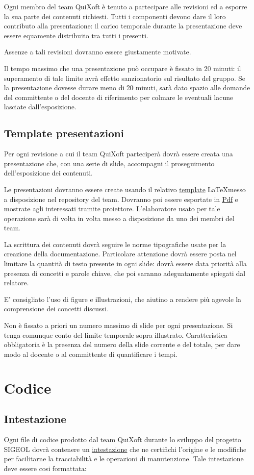 \documentclass[11pt,a4paper]{article}
\begin{document}
Ogni membro del team QuiXoft è tenuto a partecipare alle revisioni ed a esporre la sua parte dei contenuti richiesti.
Tutti i componenti devono dare il loro contributo alla presentazione: il carico temporale durante la presentazione deve essere equamente distribuito tra tutti i presenti.

Assenze a tali revisioni dovranno essere giustamente motivate.

Il tempo massimo che una presentazione può occupare è fissato in 20 minuti: il superamento di tale limite avrà effetto sanzionatorio sul risultato del gruppo.
Se la presentazione dovesse durare meno di 20 minuti, sarà dato spazio alle domande del committente o del docente di riferimento per colmare le eventuali lacune lasciate dall'esposizione.
\subsection{Template presentazioni}
Per ogni revisione a cui il team QuiXoft parteciperà dovrà essere creata una presentazione che, con una serie di slide, accompagni il proseguimento dell'esposizione dei contenuti.

Le presentazioni dovranno essere create usando il relativo \underline{template} \LaTeX \space messo a disposizione nel repository del team.
Dovranno poi essere esportate in \underline{Pdf} e mostrate agli interessati tramite proiettore.
L'elaboratore usato per tale operazione sarà di volta in volta messo a disposizione da uno dei membri del team.

La scrittura dei contenuti dovrà seguire le norme tipografiche usate per la creazione della documentazione.
Particolare attenzione dovrà essere posta nel limitare la quantità di testo presente in ogni slide: dovrà essere data priorità alla presenza di concetti e parole chiave, che poi saranno adeguatamente spiegati dal relatore.

E' consigliato l'uso di figure e illustrazioni, che aiutino a rendere più agevole la comprensione dei concetti discussi.

Non è fissato a priori un numero massimo di slide per ogni presentazione. Si tenga comunque conto del limite temporale sopra illustrato.
Caratteristica obbligatoria è la presenza del numero della slide corrente e del totale, per dare modo al docente o al committente di quantificare i tempi.
\section{Codice}
\subsection{Intestazione}
Ogni file di codice prodotto dal team QuiXoft durante lo sviluppo del progetto SIGEOL dovrà contenere un \underline{intestazione} che ne certifichi l'origine e le modifiche per facilitarne la tracciabilità e le operazioni di \underline{manutenzione}.
Tale \underline{intestazione} deve essere cosi formattata: \\
\end{document}
